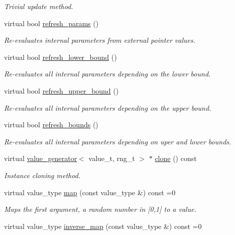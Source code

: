 \begin{DoxyCompactItemize}
\begin{DoxyCompactList}\small\item\em Trivial update method. \end{DoxyCompactList}\item 
virtual bool \hyperlink{a00577_ad5adee012d119632ceee3840161bb6c0}{refresh\+\_\+params} ()
\begin{DoxyCompactList}\small\item\em Re-\/evaluates internal parameters from external pointer values. \end{DoxyCompactList}\item 
virtual bool \hyperlink{a00577_a606b58f4f1ce170f0c789f30887d233f}{refresh\+\_\+lower\+\_\+bound} ()
\begin{DoxyCompactList}\small\item\em Re-\/evaluates all internal parameters depending on the lower bound. \end{DoxyCompactList}\item 
virtual bool \hyperlink{a00577_ab36b05cba8bbc97a7ace38ae7edf58d8}{refresh\+\_\+upper\+\_\+bound} ()
\begin{DoxyCompactList}\small\item\em Re-\/evaluates all internal parameters depending on the upper bound. \end{DoxyCompactList}\item 
virtual bool \hyperlink{a00577_a720106d300c813bb22c3f137de5b7591}{refresh\+\_\+bounds} ()
\begin{DoxyCompactList}\small\item\em Re-\/evaluates all internal parameters depending on uper and lower bounds. \end{DoxyCompactList}\item 
virtual \hyperlink{a00577}{value\+\_\+generator}$<$ value\+\_\+t, rng\+\_\+t $>$ $\ast$ \hyperlink{a00577_ae411860e047b0bffe64d3530e7bd742a}{clone} () const 
\begin{DoxyCompactList}\small\item\em Instance cloning method. \end{DoxyCompactList}\item 
\hypertarget{a00577_af4d83a08106e9049daa52dff8ce0bb09}{}virtual value\+\_\+type \hyperlink{a00577_af4d83a08106e9049daa52dff8ce0bb09}{map} (const value\+\_\+type \&) const =0\label{a00577_af4d83a08106e9049daa52dff8ce0bb09}

\begin{DoxyCompactList}\small\item\em Maps the first argument, a random number in \mbox{[}0,1\mbox{]} to a value. \end{DoxyCompactList}\item 
\hypertarget{a00577_ae242ade030ff57ec9369f3bd675eb747}{}virtual value\+\_\+type \hyperlink{a00577_ae242ade030ff57ec9369f3bd675eb747}{inverse\+\_\+map} (const value\+\_\+type \&) const =0\label{a00577_ae242ade030ff57ec9369f3bd675eb747}


\end{DoxyCompactItemize}
